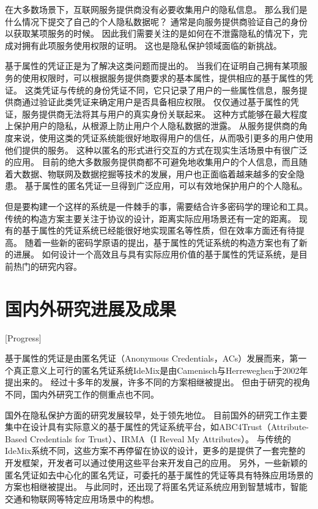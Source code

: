 在大多数场景下，互联网服务提供商没有必要收集用户的隐私信息。
那么我们是什么情况下提交了自己的个人隐私数据呢？
通常是向服务提供商验证自己的身份以获取某项服务的时候。
因此我们需要关注的是如何在不泄露隐私的情况下，完成对拥有此项服务使用权限的证明。
这也是隐私保护领域面临的新挑战。

基于属性的凭证正是为了解决这类问题而提出的。
当我们在证明自己拥有某项服务的使用权限时，可以根据服务提供商要求的基本属性，提供相应的基于属性的凭证。
这类凭证与传统的身份凭证不同，它只记录了用户的一些属性信息，服务提供商通过验证此类凭证来确定用户是否具备相应权限。
仅仅通过基于属性的凭证，服务提供商无法将其与用户的真实身份关联起来。
这种方式能够在最大程度上保护用户的隐私，从根源上防止用户个人隐私数据的泄露。
从服务提供商的角度来说，使用这类的凭证系统能很好地取得用户的信任，从而吸引更多的用户使用他们提供的服务。
这种以匿名的形式进行交互的方式在现实生活场景中有很广泛的应用。
目前的绝大多数服务提供商都不可避免地收集用户的个人信息，而且随着大数据、物联网及数据挖掘等技术的发展，用户也正面临着越来越多的安全隐患。
基于属性的匿名凭证一旦得到广泛应用，可以有效地保护用户的个人隐私。

但是要构建一个这样的系统是一件棘手的事，需要结合许多密码学的理论和工具。
传统的构造方案主要关注于协议的设计，距离实际应用场景还有一定的距离。
现有的基于属性的凭证系统已经能很好地实现匿名等性质，但在效率方面还有待提高。
随着一些新的密码学原语的提出，基于属性的凭证系统的构造方案也有了新的进展。
如何设计一个高效且与具有实际应用价值的基于属性的凭证系统，是目前热门的研究内容。

\section{国内外研究进展及成果}[Progress]

基于属性的凭证是由匿名凭证（Anonymous Credentials，ACs）发展而来，第一个真正意义上可行的匿名凭证系统IdeMix是由Camenisch与Herreweghen于2002年提出来的\cite{camenisch2002design}。
经过十多年的发展，许多不同的方案相继被提出。
但由于研究的视角不同，国内外研究工作的侧重点也不同。

国外在隐私保护方面的研究发展较早，处于领先地位。
目前国外的研究工作主要集中在设计具有实际意义的基于属性的凭证系统平台，如ABC4Trust\cite{sabouri2012attribute}（Attribute-Based Credentials for Trust）、IRMA\cite{vullers2013efficient}（I Reveal My Attributes）。
与传统的IdeMix系统不同，这些方案不再停留在协议的设计，更多的是提供了一套完整的开发框架，开发者可以通过使用这些平台来开发自己的应用。
另外，一些新颖的匿名凭证如去中心化的匿名凭证\cite{garman2014decentralized}，可委托的基于属性的凭证\cite{blomer2018delegatable}等具有特殊应用场景的方案也相继被提出。
与此同时，还出现了将匿名凭证系统应用到智慧城市\cite{de2017assessment}，智能交通\cite{neven2017privacy}和物联网\cite{viejo2019secure}等特定应用场景中的构想。

